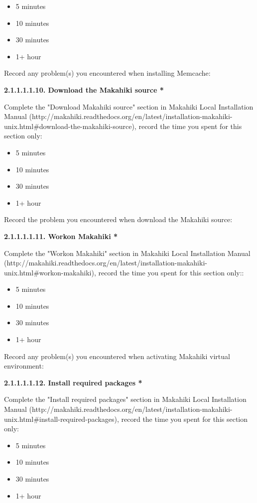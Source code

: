 \begin{itemize}
\item 5 minutes
\item  10 minutes
\item  30 minutes
\item  1+ hour
\end{itemize}

Record any problem(s) you encountered when installing Memcache:

{\bf 2.1.1.1.1.10. Download the Makahiki source *}

Complete the "Download Makahiki source" section in Makahiki Local Installation Manual (http://makahiki.readthedocs.org/en/latest/installation-makahiki-unix.html\#download-the-makahiki-source), record the time you spent for this section only:

\begin{itemize}
\item 5 minutes
\item  10 minutes
\item  30 minutes
\item  1+ hour
\end{itemize}

Record the problem you encountered when download the Makahiki source:

{\bf 2.1.1.1.1.11. Workon Makahiki *}

Complete the "Workon Makahiki" section in Makahiki Local Installation Manual (http://makahiki.readthedocs.org/en/latest/installation-makahiki-unix.html\#workon-makahiki), record the time you spent for this section only::

\begin{itemize}
\item 5 minutes
\item  10 minutes
\item  30 minutes
\item  1+ hour
\end{itemize}

Record any problem(s) you encountered when activating Makahiki virtual environment:

{\bf 2.1.1.1.1.12. Install required packages *}

Complete the "Install required packages" section in Makahiki Local Installation Manual (http://makahiki.readthedocs.org/en/latest/installation-makahiki-unix.html\#install-required-packages), record the time you spent for this section only:

\begin{itemize}
\item 5 minutes
\item  10 minutes
\item  30 minutes
\item  1+ hour
\end{itemize}

